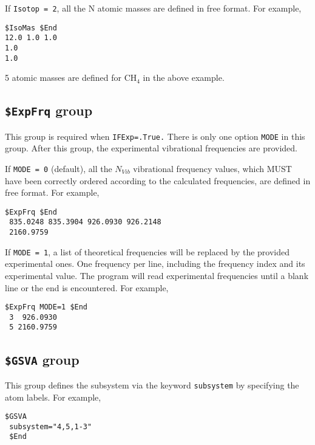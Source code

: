 \documentclass[12pt,english]{extarticle}
\begin{document}
\bigskip{}
If \verb|Isotop = 2|, all the N atomic masses are defined in free format.
For example,
\begin{Verbatim}[frame=single]
 $IsoMas $End
12.0 1.0 1.0
1.0
1.0
\end{Verbatim}
5 atomic masses are defined for CH$_4$ in the above example.


\subsection{\texttt{\$ExpFrq} group} \label{sec:inp-expfrq}

This group is required when \verb|IFExp=.True.| There is only one option
\verb|MODE| in this group. After this group, the experimental vibrational
frequencies are provided.

\bigskip{}
If \verb|MODE = 0| (default), all the $N_{Vib}$ vibrational frequency values, which MUST have been correctly
ordered according to the calculated frequencies, are defined in free format. For example,
\begin{Verbatim}[frame=single]
 $ExpFrq $End
 835.0248 835.3904 926.0930 926.2148
 2160.9759
\end{Verbatim}

If \verb|MODE = 1|, a list of theoretical frequencies will be replaced by
the provided experimental ones. One frequency per line, including the
frequency index and its experimental value. The program will
read experimental frequencies until a blank line or the end is encountered.
For example,
\begin{Verbatim}[frame=single]
 $ExpFrq MODE=1 $End
 3  926.0930
 5 2160.9759
\end{Verbatim}



\subsection{\texttt{\$GSVA} group} \label{sec:inp-gsva}

This group defines the subsystem via the keyword \verb|subsystem| by specifying the atom labels.
For example,
\begin{Verbatim}[frame=single]
 $GSVA
 subsystem="4,5,1-3"
 $End
\end{Verbatim}
\end{document}
